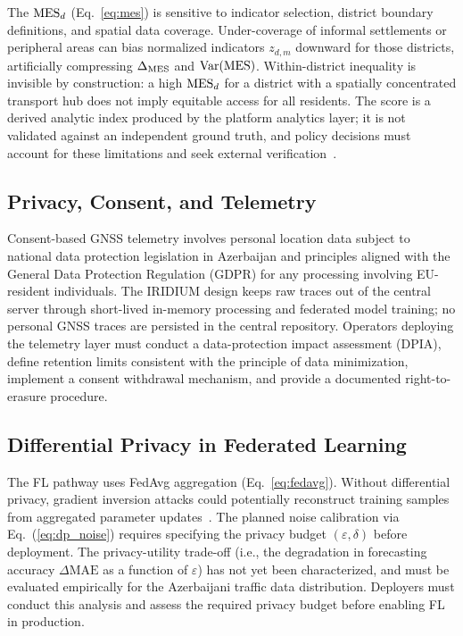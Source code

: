 The $\mathrm{MES}_d$ (Eq.~\ref{eq:mes}) is sensitive to indicator selection,
district boundary definitions, and spatial data coverage.
Under-coverage of informal settlements or peripheral areas can bias
normalized indicators $z_{d,m}$ downward for those districts, artificially
compressing $\Delta_{\mathrm{MES}}$ and $\mathrm{Var}(\mathrm{MES})$.
Within-district inequality is invisible by construction: a high $\mathrm{MES}_d$
for a district with a spatially concentrated transport hub does not imply
equitable access for all residents.
The score is a derived analytic index produced by the platform analytics
layer; it is not validated against an independent ground truth, and
policy decisions must account for these limitations and seek external
verification~\cite{karner2025transportation_equity}.

\subsection{Privacy, Consent, and Telemetry}

Consent-based GNSS telemetry involves personal location data subject to
national data protection legislation in Azerbaijan and principles aligned
with the General Data Protection Regulation (GDPR) for any processing
involving EU-resident individuals.
The IRIDIUM design keeps raw traces out of the central server through
short-lived in-memory processing and federated model training; no personal
GNSS traces are persisted in the central repository.
Operators deploying the telemetry layer must conduct a data-protection
impact assessment (DPIA), define retention limits consistent with the
principle of data minimization, implement a consent withdrawal mechanism,
and provide a documented right-to-erasure procedure.

\subsection{Differential Privacy in Federated Learning}

The FL pathway uses FedAvg aggregation (Eq.~\ref{eq:fedavg}).
Without differential privacy, gradient inversion attacks could potentially
reconstruct training samples from aggregated parameter
updates~\cite{kairouz2021advances}.
The planned noise calibration via Eq.~(\ref{eq:dp_noise}) requires
specifying the privacy budget $(\varepsilon,\delta)$ before deployment.
The privacy-utility trade-off (i.e., the degradation in forecasting
accuracy $\Delta\mathrm{MAE}$ as a function of $\varepsilon$) has not yet
been characterized, and must be evaluated empirically for the Azerbaijani
traffic data distribution.
Deployers must conduct this analysis and assess the required privacy budget
before enabling FL in production.

